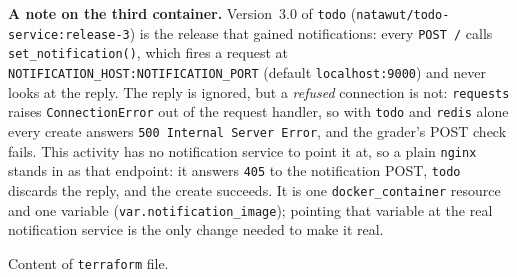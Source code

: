 \documentclass[a4paper, 10pt]{article}
\begin{document}
\noindent\textbf{A note on the third container.}
Version~3.0 of \texttt{todo} (\texttt{natawut/todo-service:release-3}) is the
release that gained notifications: every \texttt{POST /} calls
\texttt{set\_notification()}, which fires a request at
\texttt{NOTIFICATION\_HOST:\allowbreak NOTIFICATION\_PORT} (default \texttt{localhost:9000})
and never looks at the reply. The reply is ignored, but a \emph{refused}
connection is not: \texttt{requests} raises \texttt{ConnectionError} out of the
request handler, so with \texttt{todo} and \texttt{redis} alone every create
answers \texttt{500 Internal Server Error}, and the grader's POST check fails.
This activity has no notification service to point it at, so a plain
\texttt{nginx} stands in as that endpoint: it answers \texttt{405} to the
notification POST, \texttt{todo} discards the reply, and the create succeeds.
It is one \texttt{docker\_container} resource and one variable
(\texttt{var.notification\_image}); pointing that variable at the real
notification service is the only change needed to make it real.

\bigskip

\begin{problem}
Content of \texttt{terraform} file.
\end{problem}
\end{document}
